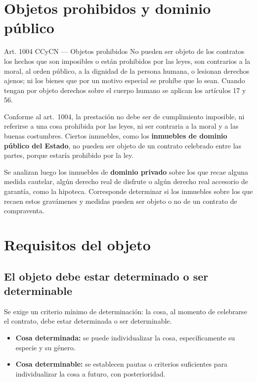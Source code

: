 \documentclass[12pt,oneside]{book}
\begin{document}
\section{Objetos prohibidos y dominio público}

\begin{definition}{Art. 1004 CCyCN --- Objetos prohibidos}
No pueden ser objeto de los contratos los hechos que son imposibles o están prohibidos por las leyes, son contrarios a la moral, al orden público, a la dignidad de la persona humana, o lesionan derechos ajenos; ni los bienes que por un motivo especial se prohíbe que lo sean. Cuando tengan por objeto derechos sobre el cuerpo humano se aplican los artículos 17 y 56.
\end{definition}

Conforme al art.\ 1004, la prestación no debe ser de cumplimiento imposible, ni referirse a una cosa prohibida por las leyes, ni ser contraria a la moral y a las buenas costumbres. Ciertos inmuebles, como los \textbf{inmuebles de dominio público del Estado}, no pueden ser objeto de un contrato celebrado entre las partes, porque estaría prohibido por la ley.

Se analizan luego los inmuebles de \textbf{dominio privado} sobre los que recae alguna medida cautelar, algún derecho real de disfrute o algún derecho real accesorio de garantía, como la hipoteca. Corresponde determinar si los inmuebles sobre los que recaen estos gravámenes y medidas pueden ser objeto o no de un contrato de compraventa.

\section{Requisitos del objeto}

\subsection{El objeto debe estar determinado o ser determinable}

Se exige un criterio mínimo de determinación: la cosa, al momento de celebrarse el contrato, debe estar determinada o ser determinable.

\begin{itemize}
\item \textbf{Cosa determinada:} se puede individualizar la cosa, específicamente su especie y su género.
\item \textbf{Cosa determinable:} se establecen pautas o criterios suficientes para individualizar la cosa a futuro, con posterioridad.
\end{itemize}
\end{document}
